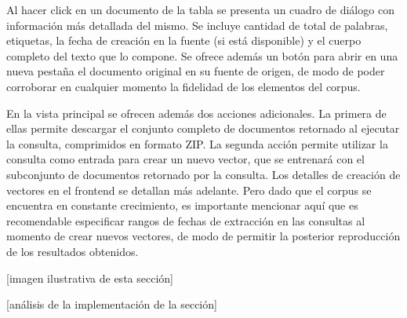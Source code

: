 Al hacer click en un documento de la tabla se presenta un cuadro de diálogo con información más detallada
del mismo. Se incluye cantidad de total de palabras, etiquetas, la fecha de creación en la fuente (si
está disponible) y el cuerpo completo del texto que lo compone. Se ofrece además un botón para abrir en
una nueva pestaña el documento original en su fuente de origen, de modo de poder corroborar en cualquier
momento la fidelidad de los elementos del corpus.

En la vista principal se ofrecen además dos acciones adicionales. La primera de ellas permite descargar
el conjunto completo de documentos retornado al ejecutar la consulta, comprimidos en formato ZIP. La
segunda acción permite utilizar la consulta como entrada para crear un nuevo vector, que se entrenará con
el subconjunto de documentos retornado por la consulta. Los detalles de creación de vectores en el
frontend se detallan más adelante. Pero dado que el corpus se encuentra en constante crecimiento, es
importante mencionar aquí que es recomendable especificar rangos de fechas de extracción en las consultas
al momento de crear nuevos vectores, de modo de permitir la posterior reproducción de los resultados
obtenidos.

[imagen ilustrativa de esta sección]

[análisis de la implementación de la sección]
